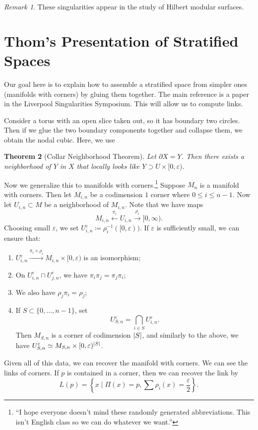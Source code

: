 \documentclass[leqno, openany]{memoir}
\newtheorem{thm}{Theorem}[chapter]
\theoremstyle{definition}
\theoremstyle{remark}
\newtheorem{rmk}[thm]{Remark}
\theoremstyle{plain}
\theoremstyle{definition}
\theoremstyle{remark}
\newcommand{\ep}{\varepsilon}
\begin{document}
\begin{rmk}
    These singularities appear in the study of Hilbert modular surfaces.
\end{rmk}

\section{Thom's Presentation of Stratified Spaces}%
\label{sec:thom_s_presentation_of_stratified_spaces}

Our goal here is to explain how to assemble a stratified space from simpler ones (manifolds with corners) by gluing them together. The main reference is a paper in the Liverpool Singularities Symposium. This will allow us to compute links.

Consider a torus with an open slice taken out, so it has boundary two circles. Then if we glue the two boundary components together and collapse them, we obtain the nodal cubic. Here, we use

\begin{thm}[Collar Neighborhood Theorem]
    Let $\partial X = Y$. Then there exists a neighborhood of $Y$ in $X$ that locally looks like $Y \supset U \times [0, \ep)$.
\end{thm}

Now we generalize this to manifolds with corners.\footnote{``I hope everyone doesn't mind these randomly generated abbreviations. This isn't English class so we can do whatever we want.''} Suppose $M_n$ is a manifold with corners. Then let $M_{i,n}$ be a codimension $1$ corner where $0 \leq i \leq n-1$. Now let $U_{i,n} \subset M$ be a neighborhood of $M_{i,n}$. Note that we have maps 
\[M_{i,n} \xleftarrow{\pi_i} U_{i,n} \xrightarrow{\rho_i} [0, \infty).\] 
Choosing small $\ep$, we set $U_{i,n}^{\ep} \coloneqq \rho_i^{-1}([0, \ep))$. If $\ep$ is sufficiently small, we can ensure that:
\begin{enumerate}
    \item $U_{i,n}^{\ep} \xrightarrow{\pi_i \times \rho_i} M_{i,n} \times [0, \ep)$ is an isomorphism;
    \item On $U_{i,n}^{\ep} \cap U_{j,n}^{\ep}$, we have $\pi_i \pi_j = \pi_j \pi_i$;
    \item We also have $\rho_j \pi_i = \rho_j$;
    \item If $S \subset \{ 0, \ldots, n-1 \}$, set \[U_{S,n}^{\ep} = \bigcap_{i \in S} U_{i,n}^{\ep}.\] Then $M_{S,n}$ is a corner of codimension $\abs{S}$, and similarly to the above, we have $U_{S,n}^{\ep} \simeq M_{S,n} \times [0, \ep)^{\abs{S}}$.
\end{enumerate}
Given all of this data, we can recover the manifold with corners. We can see the links of corners. If $p$ is contained in a corner, then we can recover the link by
\[ L(p) = \left\{ x \mid \Pi(x) = p, \sum \rho_i(x) = \frac{\ep}{2} \right\}. \]
\end{document}
